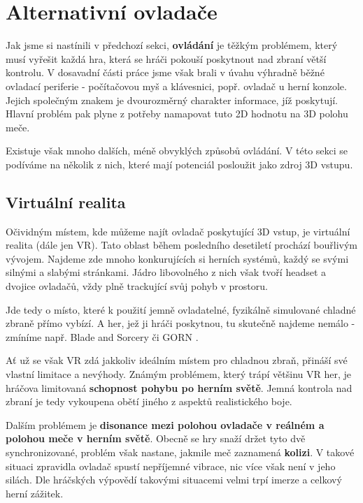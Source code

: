 \section{Alternativní ovladače} \label{alternativeControllers}

Jak jsme si nastínili v předchozí sekci, \textbf{ovládání} je těžkým problémem, který musí vyřešit každá hra, která se hráči pokouší poskytnout nad zbraní větší kontrolu. V dosavadní části práce jsme však brali v úvahu výhradně běžné ovladací periferie - počítačovou myš a klávesnici, popř. ovladač u herní konzole. Jejich společným znakem je dvourozměrný charakter informace, jíž poskytují. Hlavní problém pak plyne z potřeby namapovat tuto 2D hodnotu na 3D polohu meče. 

Existuje však mnoho dalších, méně obvyklých způsobů ovládání. V této sekci se podíváme na několik z nich, které mají potenciál posloužit jako zdroj 3D vstupu.

\subsection{Virtuální realita} \label{VRControllers}

Očividným místem, kde můžeme najít ovladač poskytující 3D vstup, je virtuální realita (dále jen \acs{VR}). Tato oblast během posledního desetiletí prochází bouřlivým vývojem. Najdeme zde mnoho konkurujících si herních systémů, každý se svými silnými a slabými stránkami. Jádro libovolného z nich však tvoří headset a dvojice ovladačů, vždy plně trackující svůj pohyb v prostoru.  

Jde tedy o místo, které k použití jemně ovladatelné, fyzikálně simulované chladné zbraně přímo vybízí. A her, jež ji hráči poskytnou, tu skutečně najdeme nemálo - zmíníme např. Blade and Sorcery \cite{BladeAndSorcery} či GORN \cite{Gorn}.

Ať už se však \acs{VR} zdá jakkoliv ideálním místem pro chladnou zbraň, přináší své vlastní limitace a nevýhody. Známým problémem, který trápí většinu \acs{VR} her, je hráčova limitovaná \textbf{schopnost pohybu po herním světě}. Jemná kontrola nad zbraní je tedy vykoupena obětí jiného z aspektů realistického boje. 

Dalším problémem je \textbf{disonance mezi polohou ovladače v reálném a polohou meče v herním světě}. Obecně se hry snaží držet tyto dvě synchronizované, problém však nastane, jakmile meč zaznamená \textbf{kolizi}. V takové situaci zpravidla ovladač spustí nepříjemné vibrace, nic více však není v jeho silách. Dle hráčských výpovědí takovými situacemi velmi trpí imerze a celkový herní zážitek. 

